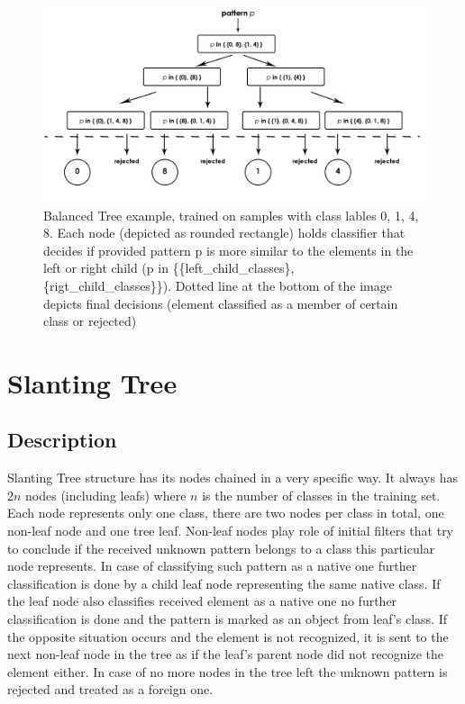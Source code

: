 \begin{figure}[!t]
	\centering
	\includegraphics[width=1\textwidth]{Figures/balanced_tree.jpg}
	\caption{Balanced Tree example, trained on samples with class lables 0, 1, 4, 8. Each node (depicted as rounded rectangle) holds classifier that decides if provided pattern p is more similar to the elements in the left or right child (p in \{\{left\_child\_classes\}, \{rigt\_child\_classes\}\}). Dotted line at the bottom of the image depicts final decisions (element classified as a member of certain class or rejected)}
	\label{fig:rejection_version1}\vspace{-3pt}
\end{figure}

\section{Slanting Tree}

\subsection{Description}
\label{slanting_tree_description}

Slanting Tree structure has its nodes chained in a very specific way. It always has $ 2n $ nodes (including leafs) where $n$ is the number of classes in the training set. Each node represents only one class, there are two nodes per class in total, one non-leaf node and one tree leaf. Non-leaf nodes play role of initial filters that try to conclude if the received unknown pattern belongs to a class this particular node represents. In case of classifying such pattern as a native one further classification is done by a child leaf node representing the same native class. If the leaf node also classifies received element as a native one no further classification is done and the pattern is marked as an object from leaf's class. If the opposite situation occurs and the element is not recognized, it is sent to the next non-leaf node in the tree as if the leaf's parent node did not recognize the element either. In case of no more nodes in the tree left the unknown pattern is rejected and treated as a foreign one.

